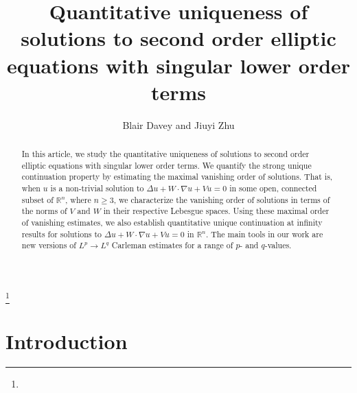 \documentclass[11pt]{amsart}
\theoremstyle{plain}
\numberwithin{equation}{section}
\begin{document}
\title[Quantitative uniqueness ]
{Quantitative uniqueness of solutions to second order elliptic equations with
singular lower order terms}
\author{ Blair Davey and Jiuyi Zhu}
\address{
Department of Mathematics\\
The City College of New York\\
New York, NY 10031, USA\\
Email: bdavey@ccny.cuny.edu }
\address{
Department of Mathematics\\
Louisiana State University\\
Baton Rouge, LA 70803, USA\\
Email:  zhu@math.lsu.edu }
\thanks{}
\date{}

\begin{abstract}
In this article, we study the quantitative uniqueness of solutions to second order elliptic equations with singular lower order terms.
We quantify the strong unique continuation property by estimating the maximal vanishing order of solutions.
That is, when $u$ is a non-trivial solution to ${\Delta} u + W \cdot {\nabla} u + V u = 0$ in some open, connected subset of ${\ensuremath{\mathbb{R}}}^n$, where $n \ge 3$, we characterize the vanishing order of solutions in terms of the norms of $V$ and $W$ in their respective Lebesgue spaces.
Using these maximal order of vanishing estimates, we also establish quantitative unique continuation at infinity results for solutions to ${\Delta} u + W \cdot {\nabla} u + V u = 0$ in ${\ensuremath{\mathbb{R}}}^n$.
The main tools in our work are new versions of $L^p\to L^q$ Carleman estimates for a
range of $p$- and $q$-values.
\end{abstract}

\maketitle
\section{Introduction}
\end{document}
